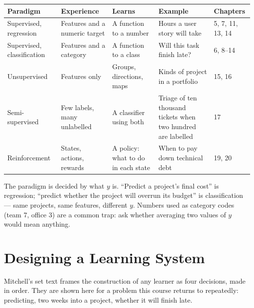\begin{longtable}{@{}L{2.6cm}L{3.0cm}L{2.9cm}L{3.9cm}L{1.6cm}@{}}
\toprule
{}
\textbf{Paradigm} & \textbf{Experience} & \textbf{Learns} & \textbf{Example} & \textbf{Chapters} \\
\midrule
\endhead
Supervised, regression & Features and a numeric target & A function to a number &
Hours a user story will take & 5, 7, 11, 13, 14 \\
Supervised, classification & Features and a category & A function to a class &
Will this task finish late? & 6, 8--14 \\
Unsupervised & Features only & Groups, directions, maps & Kinds of project in a
portfolio & 15, 16 \\
Semi-supervised & Few labels, many unlabelled & A classifier using both &
Triage of ten thousand tickets when two hundred are labelled & 17 \\
Reinforcement & States, actions, rewards & A policy: what to do in each state &
When to pay down technical debt & 19, 20 \\
\bottomrule
\end{longtable}

\begin{alertbox}
The paradigm is decided by what $y$ is. ``Predict a project's final cost'' is
regression; ``predict whether the project will overrun its budget'' is
classification --- same projects, same features, different $y$. Numbers used as
category codes (team 7, office 3) are a common trap: ask whether averaging two
values of $y$ would mean anything.
\end{alertbox}

\section{Designing a Learning System}

Mitchell's set text frames the construction of any learner as four decisions,
made in order. They are shown here for a problem this course returns to
repeatedly: predicting, two weeks into a project, whether it will finish late.

